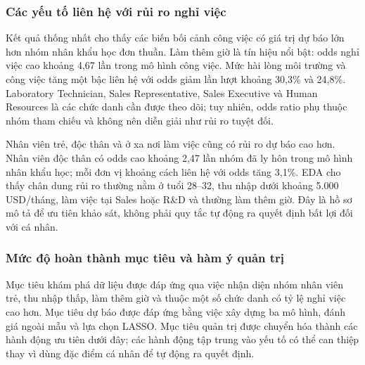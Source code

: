 \subsubsection{Các yếu tố liên hệ với rủi ro nghỉ việc}

Kết quả thống nhất cho thấy các biến bối cảnh công việc có giá trị dự
báo lớn hơn nhóm nhân khẩu học đơn thuần. Làm thêm giờ là tín hiệu nổi
bật: odds nghỉ việc cao khoảng 4,67 lần trong mô hình công việc. Mức hài
lòng môi trường và công việc tăng một bậc liên hệ với odds giảm lần lượt
khoảng 30,3\% và 24,8\%. Laboratory Technician, Sales Representative,
Sales Executive và Human Resources là các chức danh cần được theo dõi;
tuy nhiên, odds ratio phụ thuộc nhóm tham chiếu và không nên diễn giải
như rủi ro tuyệt đối.

Nhân viên trẻ, độc thân và ở xa nơi làm việc cũng có rủi ro dự báo cao
hơn. Nhân viên độc thân có odds cao khoảng 2,47 lần nhóm đã ly hôn trong
mô hình nhân khẩu học; mỗi đơn vị khoảng cách liên hệ với odds tăng
3,1\%. EDA cho thấy chân dung rủi ro thường nằm ở tuổi 28--32, thu nhập
dưới khoảng 5.000 USD/tháng, làm việc tại Sales hoặc R\&D và thường làm
thêm giờ. Đây là hồ sơ mô tả để ưu tiên khảo sát, không phải quy tắc tự
động ra quyết định bất lợi đối với cá nhân.

\subsubsection{Mức độ hoàn thành mục tiêu và hàm ý quản trị}

Mục tiêu khám phá dữ liệu được đáp ứng qua việc nhận diện nhóm nhân viên
trẻ, thu nhập thấp, làm thêm giờ và thuộc một số chức danh có tỷ lệ nghỉ
việc cao hơn. Mục tiêu dự báo được đáp ứng bằng việc xây dựng ba mô hình,
đánh giá ngoài mẫu và lựa chọn LASSO. Mục tiêu quản trị được chuyển hóa
thành các hành động ưu tiên dưới đây; các hành động tập trung vào yếu tố
có thể can thiệp thay vì dùng đặc điểm cá nhân để tự động ra quyết định.

